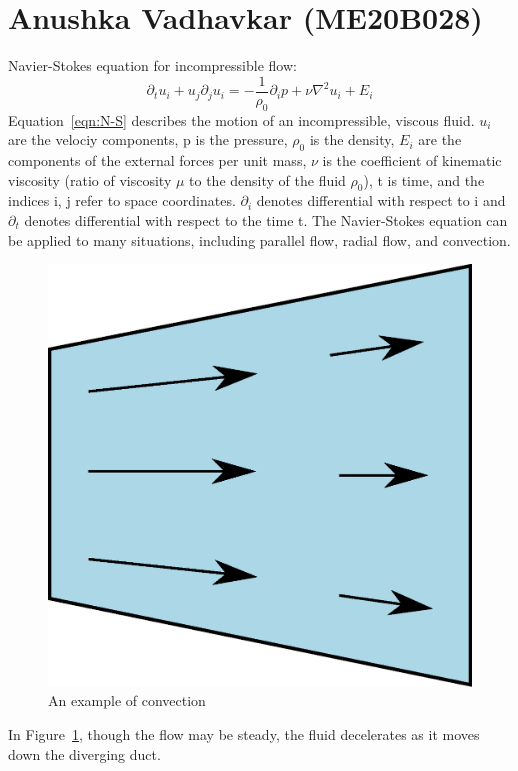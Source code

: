 \section{Anushka Vadhavkar (ME20B028)}
\smallskip
Navier-Stokes equation for incompressible flow\cite{Chorin}:
\smallskip
\begin{equation}
\partial_{t}u_{i}+u_{j}\partial_{j}u_{i}=-\frac{1}{\rho_{0}}\partial_{i}p+\nu\nabla^2u_{i}+E_{i}
\label{eqn:N-S} 
\end{equation}
Equation~\ref{eqn:N-S} describes the motion of an incompressible, viscous fluid. $u_{i}$ are the velociy components, p is the pressure, $\rho_{0}$ is the density, $E_{i}$ are the components of the external forces per unit mass, $\nu$ is the coefficient of kinematic viscosity (ratio of viscosity $\mu$ to the density of the fluid $\rho_{0}$), t is time, and the indices i, j refer to space coordinates. $\partial_{i}$ denotes differential with respect to i and $\partial_{t}$ denotes differential with respect to the time t. The Navier-Stokes equation can be applied to many situations, including parallel flow, radial flow, and convection.
\medskip
\begin{figure}[h]
\begin{center}
	\includegraphics[scale=0.25]{me20b028/me20b028.eps}
\end{center}
\caption{An example of convection}
\label{fig:convection} 
\end{figure}

In Figure~\ref{fig:convection}, though the flow may be steady, the fluid decelerates as it moves down the diverging duct.

%
%
